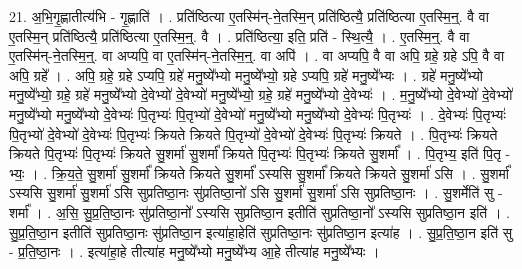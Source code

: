 \documentclass[17pt]{extarticle}
\begin{document}
21. अ॒भि॒गृ॒ह्णातीत्य॑भि - गृ॒ह्णाति॑ । . प्रति॑ष्ठित्या ए॒तस्मि॑न्-ने॒तस्मि॒न् प्रति॑ष्ठित्यै॒ प्रति॑ष्ठित्या ए॒तस्मि॒न्॒. वै वा ए॒तस्मि॒न् प्रति॑ष्ठित्यै॒ प्रति॑ष्ठित्या ए॒तस्मि॒न्॒. वै । . प्रति॑ष्ठित्या॒ इति॒ प्रति॑ - स्थि॒त्यै॒ । . ए॒तस्मि॒न्॒. वै वा ए॒तस्मि॑न्-ने॒तस्मि॒न्॒. वा अप्यपि॒ वा ए॒तस्मि॑न्-ने॒तस्मि॒न्॒. वा अपि॑ । . वा अप्यपि॒ वै वा अपि॒ ग्रहे॒ ग्रहे ऽपि॒ वै वा अपि॒ ग्रहे᳚ । . अपि॒ ग्रहे॒ ग्रहे ऽप्यपि॒ ग्रहे॑ मनु॒ष्ये᳚भ्यो मनु॒ष्ये᳚भ्यो॒ ग्रहे ऽप्यपि॒ ग्रहे॑ मनु॒ष्ये᳚भ्यः । . ग्रहे॑ मनु॒ष्ये᳚भ्यो मनु॒ष्ये᳚भ्यो॒ ग्रहे॒ ग्रहे॑ मनु॒ष्ये᳚भ्यो दे॒वेभ्यो॑ दे॒वेभ्यो॑ मनु॒ष्ये᳚भ्यो॒ ग्रहे॒ ग्रहे॑ मनु॒ष्ये᳚भ्यो दे॒वेभ्यः॑ । . म॒नु॒ष्ये᳚भ्यो दे॒वेभ्यो॑ दे॒वेभ्यो॑ मनु॒ष्ये᳚भ्यो मनु॒ष्ये᳚भ्यो दे॒वेभ्यः॑ पि॒तृभ्यः॑ पि॒तृभ्यो॑ दे॒वेभ्यो॑ मनु॒ष्ये᳚भ्यो मनु॒ष्ये᳚भ्यो दे॒वेभ्यः॑ पि॒तृभ्यः॑ । . दे॒वेभ्यः॑ पि॒तृभ्यः॑ पि॒तृभ्यो॑ दे॒वेभ्यो॑ दे॒वेभ्यः॑ पि॒तृभ्यः॑ क्रियते क्रियते पि॒तृभ्यो॑ दे॒वेभ्यो॑ दे॒वेभ्यः॑ पि॒तृभ्यः॑ क्रियते । . पि॒तृभ्यः॑ क्रियते क्रियते पि॒तृभ्यः॑ पि॒तृभ्यः॑ क्रियते सु॒शर्मा॑ सु॒शर्मा᳚ क्रियते पि॒तृभ्यः॑ पि॒तृभ्यः॑ क्रियते सु॒शर्मा᳚ । . पि॒तृभ्य॒ इति॑ पि॒तृ - भ्यः॒ । . क्रि॒य॒ते॒ सु॒शर्मा॑ सु॒शर्मा᳚ क्रियते क्रियते सु॒शर्मा᳚ ऽस्यसि सु॒शर्मा᳚ क्रियते क्रियते सु॒शर्मा॑ ऽसि । . सु॒शर्मा᳚ ऽस्यसि सु॒शर्मा॑ सु॒शर्मा॑ ऽसि सुप्रतिष्ठा॒नः सु॑प्रतिष्ठा॒नो॑ ऽसि सु॒शर्मा॑ सु॒शर्मा॑ ऽसि सुप्रतिष्ठा॒नः । . सु॒शर्मेति॑ सु - शर्मा᳚ । . अ॒सि॒ सु॒प्र॒ति॒ष्ठा॒नः सु॑प्रतिष्ठा॒नो᳚ ऽस्यसि सुप्रतिष्ठा॒न इतीति॑ सुप्रतिष्ठा॒नो᳚ ऽस्यसि सुप्रतिष्ठा॒न इति॑ । . सु॒प्र॒ति॒ष्ठा॒न इतीति॑ सुप्रतिष्ठा॒नः सु॑प्रतिष्ठा॒न इत्या॑हा॒हेति॑ सुप्रतिष्ठा॒नः सु॑प्रतिष्ठा॒न इत्या॑ह । . सु॒प्र॒ति॒ष्ठा॒न इति॑ सु - प्र॒ति॒ष्ठा॒नः । . इत्या॑हा॒हे तीत्या॑ह मनु॒ष्ये᳚भ्यो मनु॒ष्ये᳚भ्य आ॒हे तीत्या॑ह मनु॒ष्ये᳚भ्यः । \newline
\end{document}
